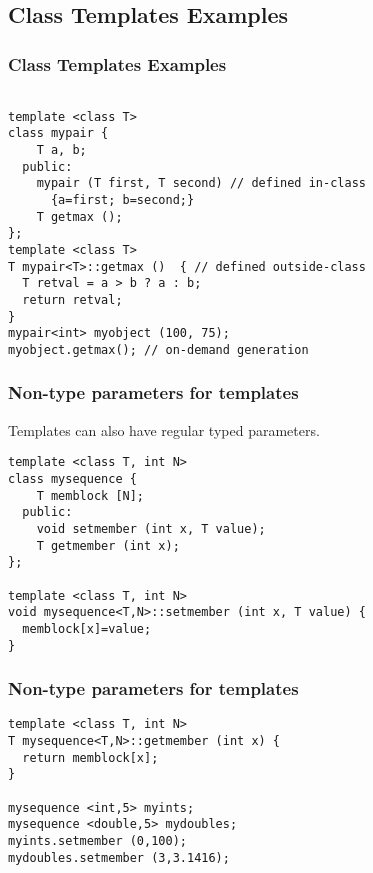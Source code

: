 \documentclass{beamer}
\begin{document}

\subsection{Class Templates Examples}

\begin{frame}[fragile]
\frametitle{Class Templates Examples}

\begin{lstlisting}

template <class T>
class mypair {
    T a, b;
  public:
    mypair (T first, T second) // defined in-class
      {a=first; b=second;}
    T getmax ();
};
template <class T>
T mypair<T>::getmax ()  { // defined outside-class
  T retval = a > b ? a : b;
  return retval;
}
mypair<int> myobject (100, 75); 
myobject.getmax(); // on-demand generation

\end{lstlisting}

\end{frame}

\begin{frame}[fragile]
\frametitle{Non-type parameters for templates}
Templates can also have regular typed parameters.
\begin{lstlisting}
template <class T, int N>
class mysequence {
    T memblock [N];
  public:
    void setmember (int x, T value);
    T getmember (int x);
};

template <class T, int N>
void mysequence<T,N>::setmember (int x, T value) {
  memblock[x]=value;
}

\end{lstlisting}
\end{frame}

\begin{frame}[fragile]
\frametitle{Non-type parameters for templates}
\begin{lstlisting}
template <class T, int N>
T mysequence<T,N>::getmember (int x) {
  return memblock[x];
}

mysequence <int,5> myints;
mysequence <double,5> mydoubles;
myints.setmember (0,100);
mydoubles.setmember (3,3.1416);

\end{lstlisting}
\end{frame}
\end{document}
